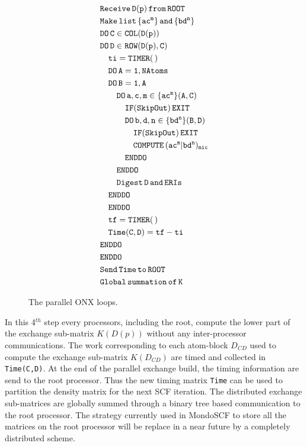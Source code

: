 \documentclass[prl,twocolumn,showpacs,twocolumngrid,superbib]{revtex4}
\begin{document}
\begin{figure}[htbp]
  \centering
  \caption{\protect
    The parallel ONX loops. 
  }\label{Fig:ONXcore}
  \begin{equation*}
    \begin{split}
      &\tt        Receive\,D(p)\,from\,ROOT\\
      &\tt        Make\,list\,\{ac^m\}\,and\,\{bd^n\} \\
      &\tt        DO\,C\in COL(D(p)) \\
      &\tt        DO\,D\in ROW(D(p),C) \\
      &\tt\quad     ti=TIMER(\,) \\
      &\tt\quad     DO\,A=1,NAtoms \\
      &\tt\quad     DO\,B=1,A \\
      &\tt\qquad      DO\,a,c,m\in\{ac^m\}(A,C) \\
      &\tt\qquad\quad   IF(SkipOut)\,EXIT  \\
      &\tt\qquad\quad   DO\,b,d,n\in\{bd^n\}(B,D) \\
      &\tt\qquad\qquad    IF(SkipOut)\,EXIT  \\
      &\tt\qquad\qquad    COMPUTE\,(ac^m|bd^n)_{mic} \\
      &\tt\qquad\quad   ENDDO \\
      &\tt\qquad      ENDDO \\
      &\tt\qquad      Digest\,D\,and\,ERIs \\
      &\tt\quad     ENDDO \\
      &\tt\quad     ENDDO \\
      &\tt\quad     tf=TIMER(\,) \\
      &\tt\quad     Time(C,D)=tf-ti \\
      &\tt        ENDDO \\
      &\tt        ENDDO \\
      &\tt        Send\,Time\,to\,ROOT \\
      &\tt        Global\,summation\,of\,K 
    \end{split}
  \end{equation*}
\end{figure}

 In this 4$^{th}$ step every processors, including the root, compute 
 the lower part of the exchange sub-matrix $K(D(p))$ 
 without any inter-processor communications. 
 The work corresponding to each atom-block
 $D_{CD}$ used to compute the exchange 
 sub-matrix $K(D_{CD})$ are timed and collected in {\tt Time(C,D)}.
 At the end of the parallel exchange build, 
 the timing information are send to the root processor.
 Thus the new timing matrix {\tt Time} can be used to partition the density 
 matrix for the next SCF iteration.
 The distributed exchange sub-matrices are globally 
 summed through a binary tree based communication to the root processor.
 The strategy currently used in {\sc MondoSCF} to store all the matrices on 
 the root processor will be replace in a near future
 by a completely distributed scheme.
 
\end{document}
